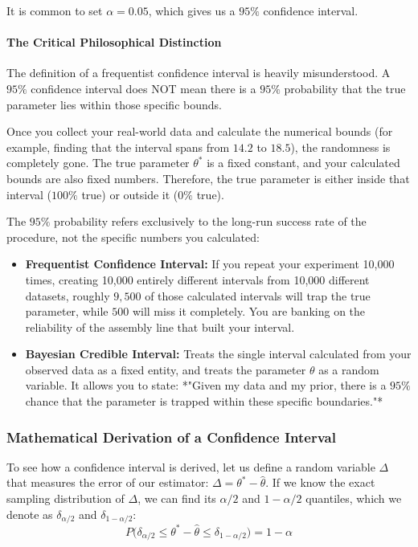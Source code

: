 \documentclass{article}
\begin{document}
It is common to set $\alpha = 0.05$, which gives us a $95\%$ confidence interval. 



\paragraph{The Critical Philosophical Distinction}
The definition of a frequentist confidence interval is heavily misunderstood. A $95\%$ confidence interval does NOT mean there is a $95\%$ probability that the true parameter lies within those specific bounds.

Once you collect your real-world data and calculate the numerical bounds (for example, finding that the interval spans from $14.2$ to $18.5$), the randomness is completely gone. The true parameter $\theta^*$ is a fixed constant, and your calculated bounds are also fixed numbers. Therefore, the true parameter is either inside that interval ($100\%$ true) or outside it ($0\%$ true). 

The $95\%$ probability refers exclusively to the long-run success rate of the procedure, not the specific numbers you calculated:
\begin{itemize}
    \item \textbf{Frequentist Confidence Interval:} If you repeat your experiment 10,000 times, creating 10,000 entirely different intervals from 10,000 different datasets, roughly $9,500$ of those calculated intervals will trap the true parameter, while $500$ will miss it completely. You are banking on the reliability of the assembly line that built your interval.
    \item \textbf{Bayesian Credible Interval:} Treats the single interval calculated from your observed data as a fixed entity, and treats the parameter $\theta$ as a random variable. It allows you to state: *"Given my data and my prior, there is a $95\%$ chance that the parameter is trapped within these specific boundaries."*
\end{itemize}

\subsubsection{Mathematical Derivation of a Confidence Interval}
To see how a confidence interval is derived, let us define a random variable $\Delta$ that measures the error of our estimator: $\Delta = \theta^* - \hat{\theta}$. If we know the exact sampling distribution of $\Delta$, we can find its $\alpha/2$ and $1 - \alpha/2$ quantiles, which we denote as $\delta_{\alpha/2}$ and $\delta_{1 - \alpha/2}$:
\begin{equation}
P\Big(\delta_{\alpha/2} \le \theta^* - \hat{\theta} \le \delta_{1 - \alpha/2}\Big) = 1 - \alpha
\end{equation}
\end{document}
